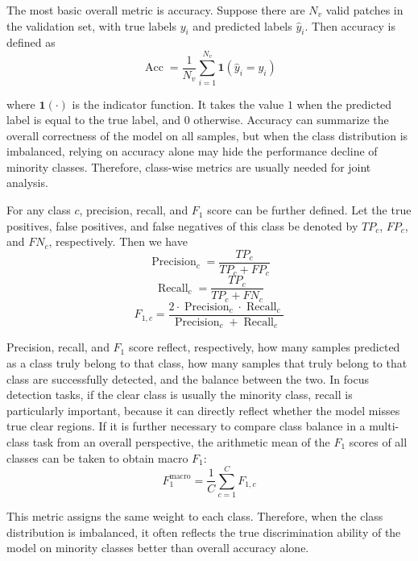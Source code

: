 \par The most basic overall metric is accuracy. Suppose there are $N_v$ valid
patches in the validation set, with true labels $y_i$ and predicted labels
$\hat{y}_i$. Then accuracy is defined as
\begin{equation}
    \operatorname{Acc}=\frac{1}{N_v}\sum_{i=1}^{N_v}\mathbf{1}(\hat{y}_i=y_i)
    \label{eq:accuracy-basic}
\end{equation}
\par where $\mathbf{1}(\cdot)$ is the indicator function. It takes the value
$1$ when the predicted label is equal to the true label, and $0$ otherwise.
Accuracy can summarize the overall correctness of the model on all samples, but
when the class distribution is imbalanced, relying on accuracy alone may hide
the performance decline of minority classes. Therefore, class-wise metrics are
usually needed for joint analysis.

\par For any class $c$, precision, recall, and $F_1$ score can be further
defined. Let the true positives, false positives, and false negatives of this
class be denoted by $TP_c$, $FP_c$, and $FN_c$, respectively. Then we have
\begin{equation}
    \operatorname{Precision}_c=\frac{TP_c}{TP_c+FP_c}
    \label{eq:precision-basic}
\end{equation}
\begin{equation}
    \operatorname{Recall}_c=\frac{TP_c}{TP_c+FN_c}
    \label{eq:recall-basic}
\end{equation}
\begin{equation}
    F_{1,c}=
    \frac{2\cdot \operatorname{Precision}_c\cdot \operatorname{Recall}_c}
    {\operatorname{Precision}_c+\operatorname{Recall}_c}
    \label{eq:f1-basic}
\end{equation}
\par Precision, recall, and $F_1$ score \cite{schutze2008introduction} reflect,
respectively, how many samples predicted as a class truly belong to that class,
how many samples that truly belong to that class are successfully detected, and
the balance between the two. In focus detection tasks, if the clear class is
usually the minority class, recall is particularly important, because it can
directly reflect whether the model misses true clear regions. If it is further
necessary to compare class balance in a multi-class task from an overall
perspective, the arithmetic mean of the $F_1$ scores of all classes can be
taken to obtain macro $F_1$:
\begin{equation}
    F_1^{\mathrm{macro}}=\frac{1}{C}\sum_{c=1}^{C}F_{1,c}
    \label{eq:macro-f1-basic}
\end{equation}
\par This metric assigns the same weight to each class. Therefore, when the
class distribution is imbalanced, it often reflects the true discrimination
ability of the model on minority classes better than overall accuracy alone.

